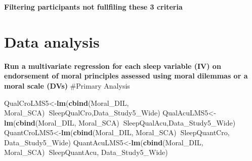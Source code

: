 \documentclass[
]{book}
\newenvironment{Shaded}{\begin{snugshade}}{\end{snugshade}}
\newcommand{\DecValTok}[1]{\textcolor[rgb]{0.00,0.00,0.81}{#1}}
\newcommand{\KeywordTok}[1]{\textcolor[rgb]{0.13,0.29,0.53}{\textbf{#1}}}
\newcommand{\NormalTok}[1]{#1}
\newcommand{\OperatorTok}[1]{\textcolor[rgb]{0.81,0.36,0.00}{\textbf{#1}}}
\newcommand{\StringTok}[1]{\textcolor[rgb]{0.31,0.60,0.02}{#1}}
\begin{document}
\textbf{Filtering participants not fullfiling these 3 criteria}

\begin{Shaded}
\end{Shaded}

\hypertarget{data-analysis-4}{%
\section{Data analysis}\label{data-analysis-4}}

\textbf{Run a multivariate regression for each sleep variable (IV) on endorsement of moral principles assessed using moral dilemmas or a moral scale (DVs)}
\#Primary Analysis

\begin{Shaded}
\begin{Highlighting}[]
\NormalTok{QualCroLMS5<-}\KeywordTok{lm}\NormalTok{(}\KeywordTok{cbind}\NormalTok{(Moral_DIL, Moral_SCA)}\OperatorTok{~}\NormalTok{SleepQualCro,Data_Study5_Wide)}
\NormalTok{QualAcuLMS5<-}\KeywordTok{lm}\NormalTok{(}\KeywordTok{cbind}\NormalTok{(Moral_DIL, Moral_SCA)}\OperatorTok{~}\NormalTok{SleepQualAcu,Data_Study5_Wide)}
\NormalTok{QuantCroLMS5<-}\KeywordTok{lm}\NormalTok{(}\KeywordTok{cbind}\NormalTok{(Moral_DIL, Moral_SCA)}\OperatorTok{~}\NormalTok{SleepQuantCro, Data_Study5_Wide)}
\NormalTok{QuantAcuLMS5<-}\KeywordTok{lm}\NormalTok{(}\KeywordTok{cbind}\NormalTok{(Moral_DIL, Moral_SCA)}\OperatorTok{~}\NormalTok{SleepQuantAcu, Data_Study5_Wide)}
\end{Highlighting}
\end{Shaded}
\end{document}
